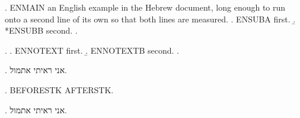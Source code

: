 \begin{english}
\ex. ENMAIN an English example in the Hebrew document, long enough to run onto a second line of its own so that both lines are measured.
\a. ENSUBA first.
\b. *ENSUBB second.
\z.
\end{english}

\begin{english}
\ex. \a. ENNOTEXT first.
\b. ENNOTEXTB second.
\z.
\end{english}

\ex. אני ראיתי  אתמול.

\ex. BEFORESTK  AFTERSTK.

\ex. אני ראיתי  אתמול.

